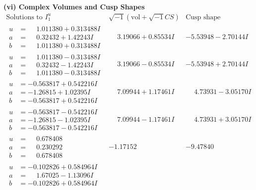 \documentclass[1p]{elsarticle_modified}
\theoremstyle{definition}
\newcommand{\I}{\sqrt{-1}}
\begin{document}
\newpage\flushleft \textbf{(vi) Complex Volumes and Cusp Shapes}
$$\begin{array}{c|c|c}  
\text{Solutions to }I^u_{1}& \I (\text{vol} + \sqrt{-1}CS) & \text{Cusp shape}\\
 \hline 
\begin{aligned}
u &= \phantom{-}1.011380 + 0.313488 I \\
a &= \phantom{-}0.32432 + 1.42243 I \\
b &= \phantom{-}1.011380 + 0.313488 I\end{aligned}
 & \phantom{-}3.19066 + 0.85534 I & -5.53948 - 2.70144 I \\ \hline\begin{aligned}
u &= \phantom{-}1.011380 - 0.313488 I \\
a &= \phantom{-}0.32432 - 1.42243 I \\
b &= \phantom{-}1.011380 - 0.313488 I\end{aligned}
 & \phantom{-}3.19066 - 0.85534 I & -5.53948 + 2.70144 I \\ \hline\begin{aligned}
u &= -0.563817 + 0.542216 I \\
a &= -1.26815 + 1.02395 I \\
b &= -0.563817 + 0.542216 I\end{aligned}
 & \phantom{-}7.09944 + 1.17461 I & \phantom{-}4.73931 - 3.05170 I \\ \hline\begin{aligned}
u &= -0.563817 - 0.542216 I \\
a &= -1.26815 - 1.02395 I \\
b &= -0.563817 - 0.542216 I\end{aligned}
 & \phantom{-}7.09944 - 1.17461 I & \phantom{-}4.73931 + 3.05170 I \\ \hline\begin{aligned}
u &= \phantom{-}0.678408\phantom{ +0.000000I} \\
a &= \phantom{-}0.230292\phantom{ +0.000000I} \\
b &= \phantom{-}0.678408\phantom{ +0.000000I}\end{aligned}
 & -1.17152\phantom{ +0.000000I} & -9.47840\phantom{ +0.000000I} \\ \hline\begin{aligned}
u &= -0.102826 + 0.584964 I \\
a &= \phantom{-}1.67025 - 1.13096 I \\
b &= -0.102826 + 0.584964 I\end{aligned}

\end{array}$$
\end{document}
